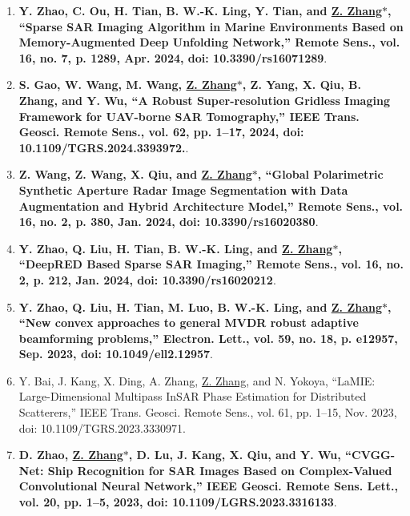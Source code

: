 \documentclass[paper=a4,fontsize=11pt]{scrartcl}
\begin{document}
\begin{enumerate}
\item \textbf{Y. Zhao, C. Ou, H. Tian, B. W.-K. Ling, Y. Tian, and \underline{Z. Zhang$\ast$}, ``Sparse SAR Imaging Algorithm in Marine Environments Based on Memory-Augmented Deep Unfolding Network,'' Remote Sens., vol. 16, no. 7, p. 1289, Apr. 2024, doi: 10.3390/rs16071289}.

\item \textbf{S. Gao, W. Wang, M. Wang, \underline{Z. Zhang$\ast$}, Z. Yang, X. Qiu, B. Zhang, and Y. Wu, ``A Robust Super-resolution Gridless Imaging Framework for UAV-borne SAR Tomography,'' IEEE Trans. Geosci. Remote Sens., vol. 62, pp. 1–17, 2024, doi: 10.1109/TGRS.2024.3393972.}.

\item \textbf{Z. Wang, Z. Wang, X. Qiu, and \underline{Z. Zhang$\ast$}, ``Global Polarimetric Synthetic Aperture Radar Image Segmentation with Data Augmentation and Hybrid Architecture Model,'' Remote Sens., vol. 16, no. 2, p. 380, Jan. 2024, doi: 10.3390/rs16020380}.

\item \textbf{Y. Zhao, Q. Liu, H. Tian, B. W.-K. Ling, and \underline{Z. Zhang$\ast$}, ``DeepRED Based Sparse SAR Imaging,'' Remote Sens., vol. 16, no. 2, p. 212, Jan. 2024, doi: 10.3390/rs16020212}.

\item \textbf{Y. Zhao, Q. Liu, H. Tian, M. Luo, B. W.-K. Ling, and \underline{Z. Zhang$\ast$}, ``New convex approaches to general MVDR robust adaptive beamforming problems,'' Electron. Lett., vol. 59, no. 18, p. e12957, Sep. 2023, doi: 10.1049/ell2.12957}.

\item Y. Bai, J. Kang, X. Ding, A. Zhang, \underline{Z. Zhang}, and N. Yokoya, ``LaMIE: Large-Dimensional Multipass InSAR Phase Estimation for Distributed Scatterers,'' IEEE Trans. Geosci. Remote Sens., vol. 61, pp. 1–15, Nov. 2023, doi: 10.1109/TGRS.2023.3330971.


\item \textbf{D. Zhao, \underline{Z. Zhang$\ast$}, D. Lu, J. Kang, X. Qiu, and Y. Wu, ``CVGG-Net: Ship Recognition for SAR Images Based on Complex-Valued Convolutional Neural Network,'' IEEE Geosci. Remote Sens. Lett., vol. 20, pp. 1–5, 2023, doi: 10.1109/LGRS.2023.3316133}.​


\end{enumerate}
\end{document}
